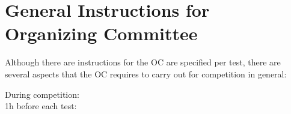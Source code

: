 \section{General Instructions for Organizing Committee}
\label{sec:oc_general_instructions}

Although there are instructions for the OC are specified per test, there are several aspects that the OC requires to carry out for competition in general:
\begin{description}
	\item[During competition:] \hfill
	\item[1h before each test:] \hfill
\end{description}


